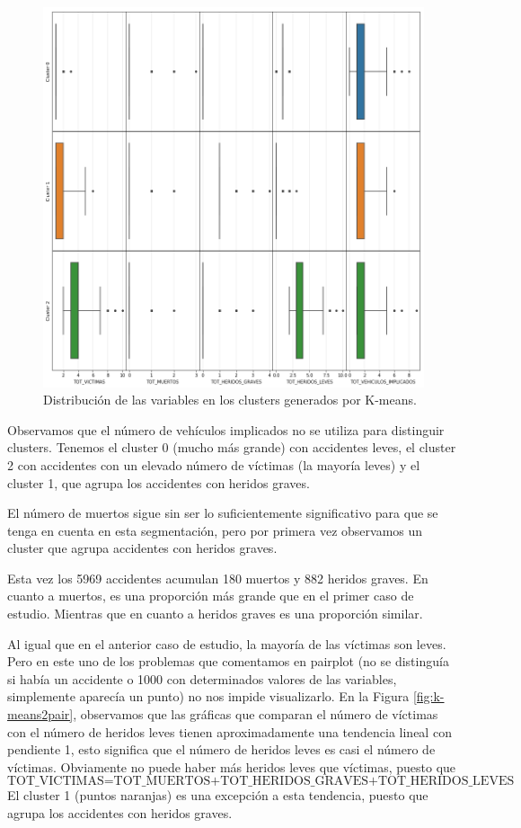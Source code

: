 \documentclass[oneside]{book}
\begin{document}
\begin{figure}[H]
  \centering
  \includegraphics[width=140mm]{figures/accidentes/k-means2distribution}
  \caption{Distribución de las variables en los clusters generados por
    K-means.}
  \label{fig:k-means2distribution}
\end{figure}

Observamos que el número de vehículos implicados no se utiliza para
distinguir clusters. Tenemos el cluster 0 (mucho más grande) con
accidentes leves, el cluster 2 con accidentes con un elevado número de
víctimas (la mayoría leves) y el cluster 1, que agrupa los accidentes
con heridos graves.

El número de muertos sigue sin ser lo suficientemente significativo
para que se tenga en cuenta en esta segmentación, pero por primera vez
observamos un cluster que agrupa accidentes con heridos graves.

Esta vez los 5969 accidentes acumulan 180 muertos y 882 heridos
graves. En cuanto a muertos, es una proporción más grande que en el
primer caso de estudio. Mientras que en cuanto a heridos graves es una
proporción similar.

Al igual que en el anterior caso de estudio, la mayoría de las
víctimas son leves. Pero en este uno de los problemas que comentamos
en pairplot (no se distinguía si había un accidente o 1000 con
determinados valores de las variables, simplemente aparecía un punto)
no nos impide visualizarlo. En la Figura \ref{fig:k-means2pair},
observamos que las gráficas que comparan el número de víctimas con el
número de heridos leves tienen aproximadamente una tendencia lineal
con pendiente 1, esto significa que el número de heridos leves es casi
el número de víctimas. Obviamente no puede haber más heridos leves que
víctimas, puesto que
\[\text{TOT\_VICTIMAS=TOT\_MUERTOS+TOT\_HERIDOS\_GRAVES+TOT\_HERIDOS\_LEVES}\]
El cluster 1 (puntos naranjas) es una excepción a esta tendencia,
puesto que agrupa los accidentes con heridos graves.
\end{document}

